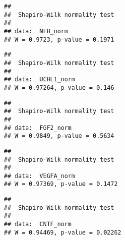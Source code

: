\documentclass[]{article}
\newenvironment{Shaded}{\begin{snugshade}}{\end{snugshade}}
\newcommand{\CommentTok}[1]{\textcolor[rgb]{0.56,0.35,0.01}{\textit{#1}}}
\newcommand{\KeywordTok}[1]{\textcolor[rgb]{0.13,0.29,0.53}{\textbf{#1}}}
\newcommand{\NormalTok}[1]{#1}
\begin{document}
\begin{verbatim}
## 
##  Shapiro-Wilk normality test
## 
## data:  NFH_norm
## W = 0.9723, p-value = 0.1971
\end{verbatim}

\begin{Shaded}
\end{Shaded}

\begin{verbatim}
## 
##  Shapiro-Wilk normality test
## 
## data:  UCHL1_norm
## W = 0.97264, p-value = 0.146
\end{verbatim}

\begin{Shaded}
\end{Shaded}

\begin{verbatim}
## 
##  Shapiro-Wilk normality test
## 
## data:  FGF2_norm
## W = 0.9849, p-value = 0.5634
\end{verbatim}

\begin{Shaded}
\end{Shaded}

\begin{verbatim}
## 
##  Shapiro-Wilk normality test
## 
## data:  VEGFA_norm
## W = 0.97369, p-value = 0.1472
\end{verbatim}

\begin{Shaded}
\end{Shaded}

\begin{verbatim}
## 
##  Shapiro-Wilk normality test
## 
## data:  CNTF_norm
## W = 0.94469, p-value = 0.02262
\end{verbatim}
\end{document}
